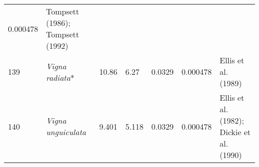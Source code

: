\documentclass[]{article}
\begin{document}
\begin{longtable}[]{@{}lllllll@{}}
\begin{minipage}[t]{0.08\columnwidth}
0.000478\strut
\end{minipage} & \begin{minipage}[t]{0.23\columnwidth}\raggedright
Tompsett (1986); Tompsett (1992)\strut
\end{minipage}\tabularnewline
\begin{minipage}[t]{0.05\columnwidth}\raggedright
139\strut
\end{minipage} & \begin{minipage}[t]{0.23\columnwidth}\raggedright
\emph{Vigna radiata}*\strut
\end{minipage} & \begin{minipage}[t]{0.05\columnwidth}\raggedright
10.86\strut
\end{minipage} & \begin{minipage}[t]{0.08\columnwidth}\raggedright
6.27\strut
\end{minipage} & \begin{minipage}[t]{0.08\columnwidth}\raggedright
0.0329\strut
\end{minipage} & \begin{minipage}[t]{0.08\columnwidth}\raggedright
0.000478\strut
\end{minipage} & \begin{minipage}[t]{0.23\columnwidth}\raggedright
Ellis et al. (1989)\strut
\end{minipage}\tabularnewline
\begin{minipage}[t]{0.05\columnwidth}\raggedright
140\strut
\end{minipage} & \begin{minipage}[t]{0.23\columnwidth}\raggedright
\emph{Vigna unguiculata}\strut
\end{minipage} & \begin{minipage}[t]{0.05\columnwidth}\raggedright
9.401\strut
\end{minipage} & \begin{minipage}[t]{0.08\columnwidth}\raggedright
5.118\strut
\end{minipage} & \begin{minipage}[t]{0.08\columnwidth}\raggedright
0.0329\strut
\end{minipage} & \begin{minipage}[t]{0.08\columnwidth}\raggedright
0.000478\strut
\end{minipage} & \begin{minipage}[t]{0.23\columnwidth}\raggedright
Ellis et al. (1982); Dickie et al. (1990)\strut
\end{minipage}\tabularnewline

\end{longtable}
\end{document}
